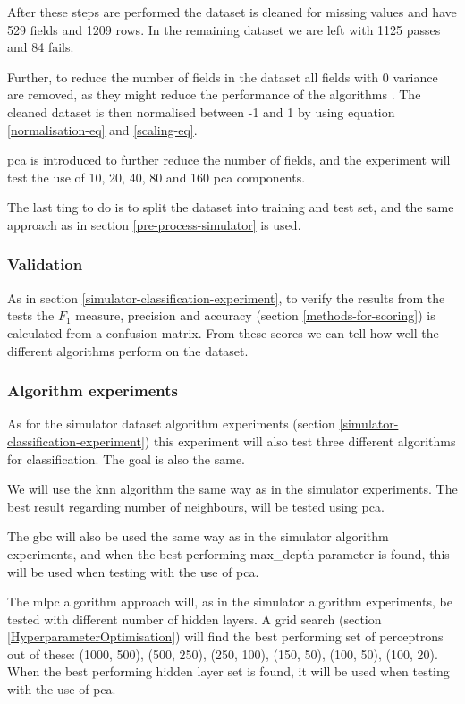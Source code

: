 \documentclass[english, a4paper]{report}
\begin{document}
{{{{                After these steps are performed the dataset is cleaned for missing values and have 529 fields and 1209 rows. In the remaining dataset we are left with 1125 passes and 84 fails. \par
                Further, to reduce the number of fields in the dataset all fields with 0 variance are removed, as they might reduce the performance of the algorithms \cite{appliedPredictiveModeling}. The cleaned dataset is then normalised between -1 and 1 by using equation \ref{normalisation-eq} and \ref{scaling-eq}. \par
                \gls{pca} is introduced to further reduce the number of fields, and the experiment will test the use of 10, 20, 40, 80 and 160 \gls{pca} components. \par
                The last ting to do is to split the dataset into training and test set, and the same approach as in section \ref{pre-process-simulator} is used.
            }
            
            \subsubsection{Validation}
            {
                As in section \ref{simulator-classification-experiment}, to verify the results from the tests the $F_1$ measure, precision and accuracy (section \ref{methods-for-scoring}) is calculated from a confusion matrix. From these scores we can tell how well the different algorithms perform on the dataset.
            }
            
            \subsubsection{Algorithm experiments}
            {
                As for the simulator dataset algorithm experiments (section \ref{simulator-classification-experiment}) this experiment will also test three different algorithms for classification. The goal is also the same.
                \par
                We will use the \gls{knn} algorithm the same way as in the simulator experiments. The best result regarding number of neighbours, will be tested using \gls{pca}.
                \par
                The \gls{gbc} will also be used the same way as in the simulator algorithm experiments, and when the best performing max\_depth parameter is found, this will be used when testing with the use of \gls{pca}.
                \par
                The \gls{mlpc} algorithm approach will, as in the simulator algorithm experiments, be tested with different number of hidden layers. A grid search (section \ref{HyperparameterOptimisation}) will find the best performing set of perceptrons out of these: (1000, 500), (500, 250), (250, 100), (150, 50), (100, 50), (100, 20). When the best performing hidden layer set is found, it will be used when testing with the use of \gls{pca}. 
            }
        }
    }
    
}
\end{document}
